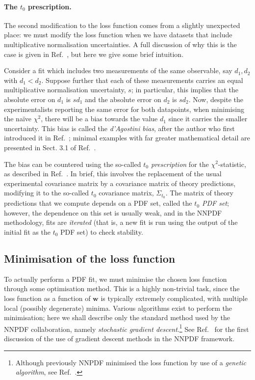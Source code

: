 \documentclass[withindex,glossary]{cam-thesis}
\renewcommand{\vec}[1]{\textbf{#1}} %
\begin{document}
\paragraph{The $t_0$ prescription.} The second modification to the loss function comes from a slightly unexpected place: we must modify the loss function when we have datasets that include multiplicative normalisation uncertainties. A full discussion of why this is the case is given in Ref.~\cite{Ball:2009qv}, but here we give some brief intuition. 

Consider a fit which includes two measurements of the same observable, say $d_1, d_2$ with $d_1 < d_2$. Suppose further that each of these measurements carries an equal multiplicative normalisation uncertainty, $s$; in particular, this implies that the absolute error on $d_1$ is $s d_1$ and the absolute error on $d_2$ is $s d_2$. Now, despite the experimentalists reporting the same error for both datapoints, when minimising the na\"{i}ve $\chi^2$, there will be a bias towards the value $d_1$ since it carries the smaller uncertainty. This bias is called the \textit{d'Agostini bias}, after the author who first introduced it in Ref.~\cite{DAgostini:1993arp}; minimal examples with far greater mathematical detail are presented in Sect. 3.1 of Ref.~\cite{Ball:2009qv}.

The bias can be countered using the so-called \textit{$t_0$ prescription} for the $\chi^2$-statistic, as described in Ref.~\cite{Ball:2009qv}. In brief, this involves the replacement of the usual experimental covariance matrix by a covariance matrix of theory predictions, modifying it to the so-called $t_0$ covariance matrix, $\Sigma_{t_0}$. The matrix of theory predictions that we compute depends on a PDF set, called the \textit{$t_0$ PDF set}; however, the dependence on this set is usually weak, and in the NNPDF methodology, fits are \textit{iterated} (that is, a new fit is run using the output of the initial fit as the $t_0$ PDF set) to check stability.

\subsection{Minimisation of the loss function}
To actually perform a PDF fit, we must minimise the chosen loss function through some optimisation method. This is a highly non-trivial task, since the loss function as a function of $\vec{w}$ is typically extremely complicated, with multiple local (possibly degenerate) minima. Various algorithms exist to perform the minimisation; here we shall describe only the standard method used by the NNPDF collaboration, namely \textit{stochastic gradient descent}.\footnote{Although previously NNPDF minimised the loss function by use of a \textit{genetic algorithm}, see Ref.~\cite{NNPDF:2014otw}.} See Ref.~\cite{Carrazza:2019mzf} for the first discussion of the use of gradient descent methods in the NNPDF framework.
\end{document}
